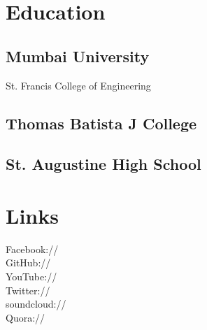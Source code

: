 \documentclass[hidelinks]{deedy-resume-openfont}
\renewcommand{\sectionsep}[0]{\vspace{8pt}}
\begin{document}
%
%

%
%



%
%

\begin{minipage}[t]{0.33\textwidth}


\section{Education}

\subsection{Mumbai University}
St. Francis College of Engineering \\
\sectionsep

\subsection{Thomas Batista J College}
\sectionsep

\subsection{St. Augustine High School}
\sectionsep


\section{Links}
Facebook:// \href{https://facebook.com/rihenp}{} \\
GitHub:// \href{https://github.com/rihbyne}{} \\
YouTube:// \href{https://www.youtube.com/c/RihanPereira}{} \\
Twitter:// \href{https://twitter.com/rihbyne}{} \\
soundcloud:// \href{http://www.soundcloud.com/rihbyne}{} \\
Quora://  \href{https://www.quora.com/Rihan-Pereira}{}


\end{minipage}
\end{document}
